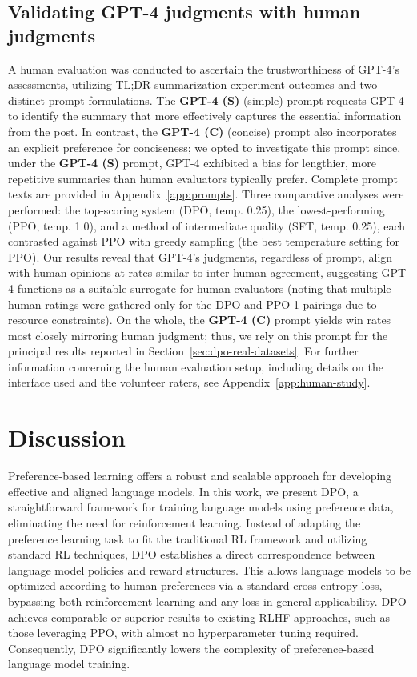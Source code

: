 \subsection{Validating GPT-4 judgments with human judgments}
\label{sec:human-judgments}
A human evaluation was conducted to ascertain the trustworthiness of GPT-4’s assessments, utilizing TL;DR summarization experiment outcomes and two distinct prompt formulations. The \textbf{GPT-4 (S)} (simple) prompt requests GPT-4 to identify the summary that more effectively captures the essential information from the post. In contrast, the \textbf{GPT-4 (C)} (concise) prompt also incorporates an explicit preference for conciseness; we opted to investigate this prompt since, under the \textbf{GPT-4 (S)} prompt, GPT-4 exhibited a bias for lengthier, more repetitive summaries than human evaluators typically prefer. Complete prompt texts are provided in Appendix~\ref{app:prompts}. Three comparative analyses were performed: the top-scoring system (DPO, temp. 0.25), the lowest-performing (PPO, temp. 1.0), and a method of intermediate quality (SFT, temp. 0.25), each contrasted against PPO with greedy sampling (the best temperature setting for PPO). Our results reveal that GPT-4’s judgments, regardless of prompt, align with human opinions at rates similar to inter-human agreement, suggesting GPT-4 functions as a suitable surrogate for human evaluators (noting that multiple human ratings were gathered only for the DPO and PPO-1 pairings due to resource constraints). On the whole, the \textbf{GPT-4 (C)} prompt yields win rates most closely mirroring human judgment; thus, we rely on this prompt for the principal results reported in Section~\ref{sec:dpo-real-datasets}. For further information concerning the human evaluation setup, including details on the interface used and the volunteer raters, see Appendix~\ref{app:human-study}.

\section{Discussion}
Preference-based learning offers a robust and scalable approach for developing effective and aligned language models. In this work, we present DPO, a straightforward framework for training language models using preference data, eliminating the need for reinforcement learning. Instead of adapting the preference learning task to fit the traditional RL framework and utilizing standard RL techniques, DPO establishes a direct correspondence between language model policies and reward structures. This allows language models to be optimized according to human preferences via a standard cross-entropy loss, bypassing both reinforcement learning and any loss in general applicability. DPO achieves comparable or superior results to existing RLHF approaches, such as those leveraging PPO, with almost no hyperparameter tuning required. Consequently, DPO significantly lowers the complexity of preference-based language model training.

